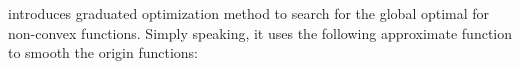 \cite{Hazan2015} introduces  graduated optimization method to search for the global optimal for non-convex functions. Simply speaking, it uses the following approximate function to smooth the origin functions:
